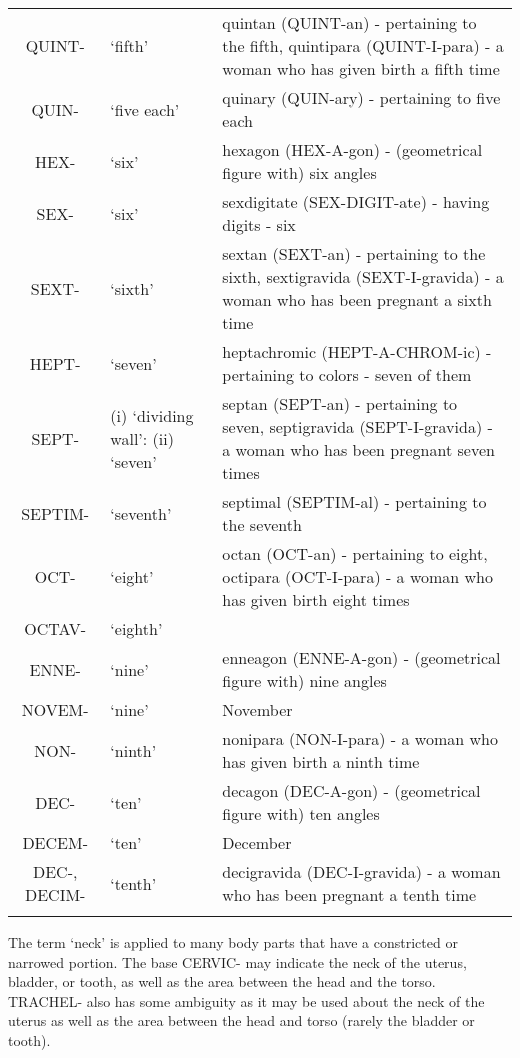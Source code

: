 \begin{longtable}{c | p{} | p{}}
        QUINT- & `fifth' & quintan (QUINT-an) - pertaining to the fifth, quintipara (QUINT-I-para) - a woman who has given birth a fifth time \\
        QUIN- & `five each' & quinary (QUIN-ary) - pertaining to five each \\
        HEX- & `six' & hexagon (HEX-A-gon) - (geometrical figure with) six angles \\
        SEX- & `six' & sexdigitate (SEX-DIGIT-ate) - having digits - six \\
        SEXT- & `sixth' & sextan (SEXT-an) - pertaining to the sixth, sextigravida (SEXT-I-gravida) - a woman who has been pregnant a sixth time \\
        HEPT- & `seven' & heptachromic (HEPT-A-CHROM-ic) - pertaining to colors - seven of them \\
        SEPT- & (i) `dividing wall': (ii) `seven' & septan (SEPT-an) - pertaining to seven, septigravida (SEPT-I-gravida) - a woman who has been pregnant seven times \\
        SEPTIM- & `seventh' & septimal (SEPTIM-al) - pertaining to the seventh \\
        OCT- & `eight' & octan (OCT-an) - pertaining to eight, octipara (OCT-I-para) - a woman who has given birth eight times \\
        OCTAV- & `eighth' &\\
        ENNE- & `nine' & enneagon (ENNE-A-gon) - (geometrical figure with) nine angles \\
        NOVEM- & `nine' & November \\
        NON- & `ninth' & nonipara (NON-I-para) - a woman who has given birth a ninth time \\
        DEC- & `ten' & decagon (DEC-A-gon) - (geometrical figure with) ten angles \\
        DECEM- & `ten' & December \\
        DEC-, DECIM- & `tenth' & decigravida (DEC-I-gravida) - a woman who has been pregnant a tenth time \\
    \label{tab:Ch9Base}
\end{longtable}

The term `neck' is applied to many body parts that have a constricted or narrowed portion. The base CERVIC- may indicate the neck of the uterus, bladder, or tooth, as well as the area between the head and the torso. TRACHEL- also has some ambiguity as it may be used about the neck of the uterus as well as the area between the head and torso (rarely the bladder or tooth).


